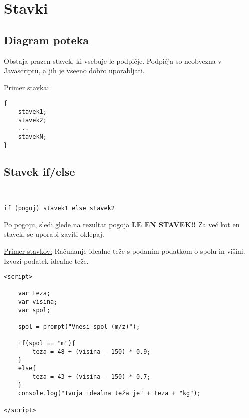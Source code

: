 \newpage
\section{Stavki}

\subsection*{Diagram poteka}


Obstaja prazen stavek, ki vsebuje le podpičje. Podpičja so neobvezna v Javascriptu, a jih je vseeno dobro uporabljati.\

Primer stavka:
\begin{verbatim}
{
	stavek1;
	stavek2;
	...
	stavekN;	
}
\end{verbatim}
\subsection{Stavek if/else}\
\begin{verbatim}
if (pogoj) stavek1 else stavek2
\end{verbatim}
Po pogoju, sledi glede na rezultat pogoja \textbf{LE EN STAVEK!!} Za več kot en stavek, se uporabi zaviti oklepaj.\

\newpage
\underline{Primer stavkov:}
Računanje idealne teže s podanim podatkom o spolu in višini. Izvozi podatek idealne teže.
\begin{verbatim}
<script>

    var teza;
    var visina;
    var spol;

    spol = prompt("Vnesi spol (m/z)");

    if(spol == "m"){
        teza = 48 + (visina - 150) * 0.9;
    }
    else{
        teza = 43 + (visina - 150) * 0.7;    
    }
    console.log("Tvoja idealna teža je" + teza + "kg");
    
</script>
\end{verbatim}

